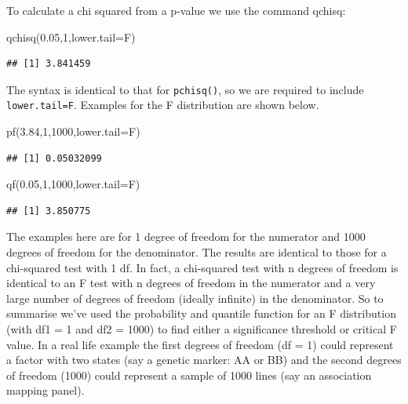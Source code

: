 \documentclass[
]{book}
\newenvironment{Shaded}{\begin{snugshade}}{\end{snugshade}}
\newcommand{\AttributeTok}[1]{\textcolor[rgb]{0.77,0.63,0.00}{#1}}
\newcommand{\DecValTok}[1]{\textcolor[rgb]{0.00,0.00,0.81}{#1}}
\newcommand{\FloatTok}[1]{\textcolor[rgb]{0.00,0.00,0.81}{#1}}
\newcommand{\FunctionTok}[1]{\textcolor[rgb]{0.00,0.00,0.00}{#1}}
\newcommand{\NormalTok}[1]{#1}
\begin{document}
To calculate a chi squared from a p-value we use the command qchisq:

\begin{Shaded}
\begin{Highlighting}[]
\FunctionTok{qchisq}\NormalTok{(}\FloatTok{0.05}\NormalTok{,}\DecValTok{1}\NormalTok{,}\AttributeTok{lower.tail=}\NormalTok{F)}
\end{Highlighting}
\end{Shaded}

\begin{verbatim}
## [1] 3.841459
\end{verbatim}

The syntax is identical to that for \texttt{pchisq()}, so we are required to include \texttt{lower.tail=F}.
Examples for the F distribution are shown below.

\begin{Shaded}
\begin{Highlighting}[]
\FunctionTok{pf}\NormalTok{(}\FloatTok{3.84}\NormalTok{,}\DecValTok{1}\NormalTok{,}\DecValTok{1000}\NormalTok{,}\AttributeTok{lower.tail=}\NormalTok{F)}
\end{Highlighting}
\end{Shaded}

\begin{verbatim}
## [1] 0.05032099
\end{verbatim}

\begin{Shaded}
\begin{Highlighting}[]
\FunctionTok{qf}\NormalTok{(}\FloatTok{0.05}\NormalTok{,}\DecValTok{1}\NormalTok{,}\DecValTok{1000}\NormalTok{,}\AttributeTok{lower.tail=}\NormalTok{F)}
\end{Highlighting}
\end{Shaded}

\begin{verbatim}
## [1] 3.850775
\end{verbatim}

The examples here are for 1 degree of freedom for the numerator and 1000 degrees of freedom for the denominator. The results are identical to those for a chi-squared test with 1 df. In fact, a chi-squared test with n degrees of freedom is identical to an F test with n degrees of freedom in the numerator and a very large number of degrees of freedom (ideally infinite) in the denominator. So to summarise we've used the probability and quantile function for an F distribution (with df1 = 1 and df2 = 1000) to find either a significance threshold or critical F value. In a real life example the first degrees of freedom (df = 1) could represent a factor with two states (say a genetic marker: AA or BB) and the second degrees of freedom (1000) could represent a sample of 1000 lines (say an association mapping panel).
\end{document}
